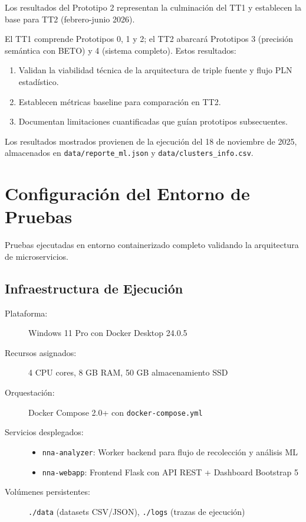 
Los resultados del Prototipo 2 representan la culminación del TT1 y establecen la base para TT2 (febrero-junio 2026).

El TT1 comprende Prototipos 0, 1 y 2; el TT2 abarcará Prototipos 3 (precisión semántica con BETO) y 4 (sistema completo). Estos resultados:

\begin{enumerate}
    \item Validan la viabilidad técnica de la arquitectura de triple fuente y flujo PLN estadístico.
    \item Establecen métricas baseline para comparación en TT2.
    \item Documentan limitaciones cuantificadas que guían prototipos subsecuentes.
\end{enumerate}

Los resultados mostrados provienen de la ejecución del 18 de noviembre de 2025, almacenados en \texttt{data/reporte\_ml.json} y \texttt{data/clusters\_info.csv}.

\section{Configuración del Entorno de Pruebas}
\label{sec:config_pruebas}

Pruebas ejecutadas en entorno containerizado completo validando la arquitectura de microservicios.

\subsection{Infraestructura de Ejecución}
\label{subsec:infra_ejecucion}

\begin{description}
    \item[Plataforma:] Windows 11 Pro con Docker Desktop 24.0.5
    \item[Recursos asignados:] 4 CPU cores, 8 GB RAM, 50 GB almacenamiento SSD
    \item[Orquestación:] Docker Compose 2.0+ con \texttt{docker-compose.yml}
    \item[Servicios desplegados:] 
    \begin{itemize}
        \item \texttt{nna-analyzer}: Worker backend para flujo de recolección y análisis ML
        \item \texttt{nna-webapp}: Frontend Flask con API REST + Dashboard Bootstrap 5
    \end{itemize}
    \item[Volúmenes persistentes:] \texttt{./data} (datasets CSV/JSON), \texttt{./logs} (trazas de ejecución)
\end{description}

